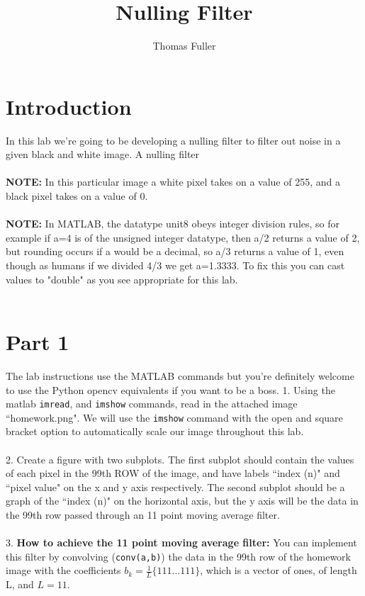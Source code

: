 \documentclass[10pt,a4paper]{article}
\author{Thomas Fuller}
\title{Nulling Filter}
\begin{document}
\maketitle
\section*{Introduction}
In this lab we're going to be developing a nulling filter to filter out noise in a given black and white image.  A nulling filter
\\ \\
\textbf{NOTE:} In this particular image a white pixel takes on a value of 255, and a black pixel takes on a value of 0.  
\\ \\
\textbf{NOTE:} In MATLAB, the datatype unit8 obeys integer division rules, so for example if a=4 is of the unsigned integer datatype, then a/2 returns a value of 2, but rounding occurs if a would be a decimal, so a/3 returns a value of 1, even though as humans if we divided 4/3 we get a=1.3333.  To fix this you can cast values to "double" as you see appropriate for this lab.  
\\ \\
\section*{Part 1}
The lab instructions use the MATLAB commands but you're definitely welcome to use the Python opencv equivalents if you want to be a boss. 
1.  Using the matlab \texttt{imread}, and \texttt{imshow} commands, read in the attached image ``homework.png".  We will use the \texttt{imshow} command with the open and square bracket option to automatically scale our image throughout this lab.  
\\ \\
2. Create a figure with two subplots.  The first subplot should contain the values of each pixel in the 99th ROW of the image, and have labels ``index (n)" and ``pixel value" on the x and y axis respectively.  The second subplot should be a graph of the ``index (n)" on the horizontal axis, but the y axis will be the data in the 99th row passed through an 11 point moving average filter.
\\ \\
3.  \textbf{How to achieve the 11 point moving average filter:}  You can implement this filter by convolving (\texttt{conv(a,b)}) the data in the 99th row of the homework image with the coefficients $b_{k} = \frac{1}{L}\{1 1 1 ... 1 1 1\}$, which is a vector of ones, of length L, and $L=11$.  
\end{document}
